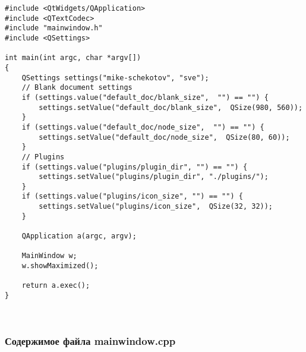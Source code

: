 \begin{lstlisting}
#include <QtWidgets/QApplication>
#include <QTextCodec>
#include "mainwindow.h"
#include <QSettings>

int main(int argc, char *argv[])
{
    QSettings settings("mike-schekotov", "sve");
    // Blank document settings
    if (settings.value("default_doc/blank_size",  "") == "") {
        settings.setValue("default_doc/blank_size",  QSize(980, 560));
    }
    if (settings.value("default_doc/node_size",  "") == "") {
        settings.setValue("default_doc/node_size",  QSize(80, 60));
    }
    // Plugins
    if (settings.value("plugins/plugin_dir", "") == "") {
        settings.setValue("plugins/plugin_dir", "./plugins/");
    }
    if (settings.value("plugins/icon_size", "") == "") {
        settings.setValue("plugins/icon_size",  QSize(32, 32));
    }

    QApplication a(argc, argv);

    MainWindow w;
    w.showMaximized();

    return a.exec();
}
\end{lstlisting}~\\

\subsubsection*{Содержимое файла mainwindow.cpp}

